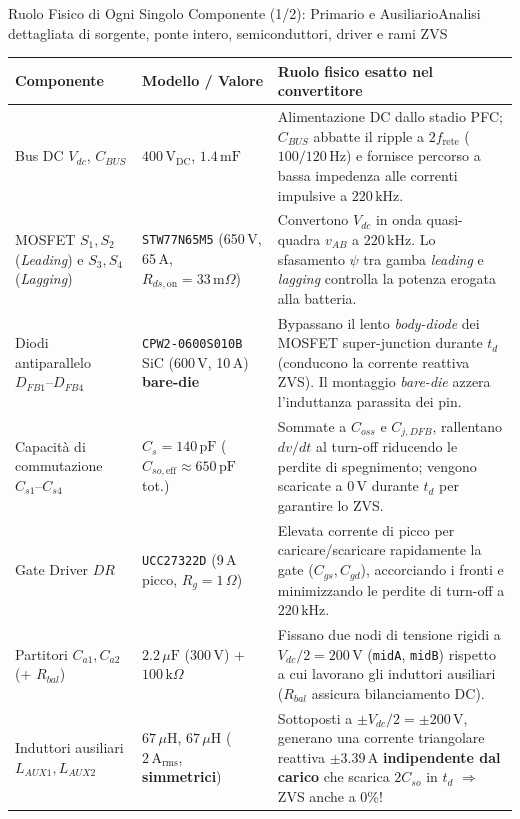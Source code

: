 \documentclass[aspectratio=169,9pt]{beamer}
\newcommand{\V}{\,\text{V}}
\newcommand{\A}{\,\text{A}}
\newcommand{\kHz}{\,\text{kHz}}
\newcommand{\uH}{\,\mu\text{H}}
\newcommand{\uF}{\,\mu\text{F}}
\newcommand{\mF}{\,\text{mF}}
\newcommand{\pF}{\,\text{pF}}
\newcommand{\Ohm}{\,\Omega}
\newcommand{\mOhm}{\,\text{m}\Omega}
\newcommand{\kOhm}{\,\text{k}\Omega}
\begin{document}
\begin{frame}{Ruolo Fisico di Ogni Singolo Componente (1/2): Primario e Ausiliario}{Analisi dettagliata di sorgente, ponte intero, semiconduttori, driver e rami ZVS}
  \scriptsize
  \setlength{\tabcolsep}{3.5pt}
  \renewcommand{\arraystretch}{1.20}
  \begin{tabular}{@{}>{\raggedright\arraybackslash}p{2.25cm}>{\raggedright\arraybackslash}p{2.85cm}>{\raggedright\arraybackslash}p{8.8cm}@{}}
    \toprule
    \textbf{Componente} & \textbf{Modello / Valore} & \textbf{Ruolo fisico esatto nel convertitore} \\
    \midrule
    Bus DC $V_{dc}$, $C_{BUS}$ & $400\V_{\text{DC}}$, $1.4\mF$ & Alimentazione DC dallo stadio PFC; $C_{BUS}$ abbatte il ripple a $2f_{\text{rete}}$ ($100/120\,\text{Hz}$) e fornisce percorso a bassa impedenza alle correnti impulsive a $220\kHz$. \\
    MOSFET $S_1, S_2$ (\emph{Leading}) e $S_3, S_4$ (\emph{Lagging}) & \texttt{STW77N65M5} (650\,V, 65\,A, $R_{ds,\text{on}}=33\mOhm$) & Convertono $V_{dc}$ in onda quasi-quadra $v_{AB}$ a $220\kHz$. Lo sfasamento $\psi$ tra gamba \emph{leading} e \emph{lagging} controlla la potenza erogata alla batteria. \\
    Diodi antiparallelo $D_{FB1}\text{--}D_{FB4}$ & \texttt{CPW2-0600S010B} SiC (600\,V, 10\,A) \textbf{bare-die} & Bypassano il lento \emph{body-diode} dei MOSFET super-junction durante $t_d$ (conducono la corrente reattiva ZVS). Il montaggio \emph{bare-die} azzera l'induttanza parassita dei pin. \\
    Capacit\`a di commutazione $C_{s1}\text{--}C_{s4}$ & $C_s=140\pF$ ($C_{so,\text{eff}}\approx 650\pF$ tot.) & Sommate a $C_{oss}$ e $C_{j,DFB}$, rallentano $dv/dt$ al turn-off riducendo le perdite di spegnimento; vengono scaricate a $0\V$ durante $t_d$ per garantire lo ZVS. \\
    Gate Driver $DR$ & \texttt{UCC27322D} (9\,A picco, $R_g=1\Ohm$) & Elevata corrente di picco per caricare/scaricare rapidamente la gate ($C_{gs}, C_{gd}$), accorciando i fronti e minimizzando le perdite di turn-off a $220\kHz$. \\
    Partitori $C_{a1}, C_{a2}$ (+ $R_{bal}$) & $2.2\uF$ (300\,V) + $100\kOhm$ & Fissano due nodi di tensione rigidi a $V_{dc}/2 = 200\V$ (\texttt{midA}, \texttt{midB}) rispetto a cui lavorano gli induttori ausiliari ($R_{bal}$ assicura bilanciamento DC). \\
    Induttori ausiliari $L_{AUX1}, L_{AUX2}$ & $67\uH$, $67\uH$ ($2\A_{\text{rms}}$, \textbf{simmetrici}) & Sottoposti a $\pm V_{dc}/2=\pm 200\V$, generano una corrente triangolare reattiva $\pm 3.39\A$ \textbf{indipendente dal carico} che scarica $2C_{so}$ in $t_d$ $\Rightarrow$ ZVS anche a 0\%! \\
    \bottomrule
  \end{tabular}
\end{frame}
\end{document}
